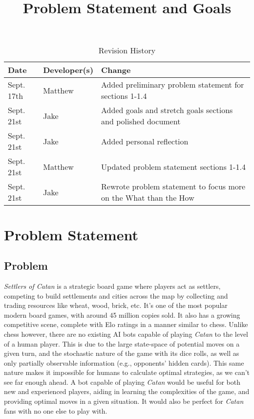 \documentclass{article}
\title{Problem Statement and Goals\\\progname}
\author{\authname}
\date{}
\begin{document}
\maketitle

\begin{table}[hp]
\caption{Revision History} \label{TblRevisionHistory}
\begin{tabularx}{\textwidth}{llX}
\toprule
\textbf{Date} & \textbf{Developer(s)} & \textbf{Change}\\
\midrule
Sept. 17th & Matthew & Added preliminary problem statement for sections 1-1.4\\
Sept. 21st & Jake & Added goals and stretch goals sections and polished document\\
Sept. 21st & Jake & Added personal reflection\\
Sept. 21st & Matthew & Updated problem statement sections 1-1.4\\
Sept. 21st & Jake & Rewrote problem statement to focus more on the What than the How\\
\bottomrule
\end{tabularx}
\end{table}

\section{Problem Statement}\label{sec:problem-statement}

\subsection{Problem}
\emph{Settlers of Catan} is a strategic board game where players act as settlers, competing to build settlements and cities across the map by collecting and trading resources like wheat, wood, brick, etc.
It's one of the most popular modern board games, with around 45 million copies sold.
It also has a growing competitive scene, complete with Elo ratings in a manner similar to chess.
Unlike chess however, there are no existing AI bots capable of playing \emph{Catan} to the level of a human player.
This is due to the large state-space of potential moves on a given turn, and the stochastic nature of the game with its dice rolls, as well as only partially observable information (e.g., opponents' hidden cards).
This same nature makes it impossible for humans to calculate optimal strategies, as we can't see far enough ahead.
A bot capable of playing \emph{Catan} would be useful for both new and experienced players, aiding in learning the complexities of the game, and providing optimal moves in a given situation.
It would also be perfect for \emph{Catan} fans with no one else to play with.
\end{document}
